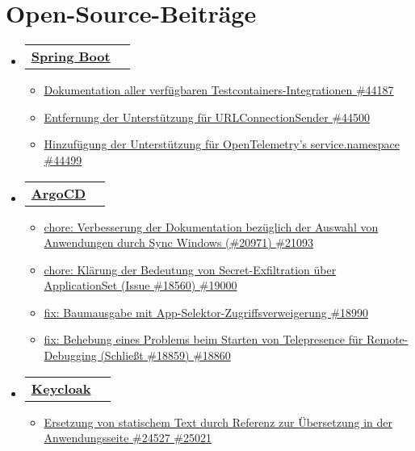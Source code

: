 \documentclass[a4paper,12pt]{article}
\makeatletter
\newcommand{\resumeItem}[1]{
	\item\small{
		{#1 \vspace{-2pt}}
	}
}
\newcommand{\resumeSubheadingSingleLine}[2]{
	\vspace{-2pt}\item
	\begin{tabular*}{0.97\textwidth}[t]{l@{\extracolsep{\fill}}r}
		\textbf{#1} & #2
	\end{tabular*}\vspace{-7pt}
}
\newcommand{\resumeSubHeadingListStart}{\begin{itemize}[leftmargin=0.15in, label={}]}
\newcommand{\resumeSubHeadingListEnd}{\end{itemize}}
\newcommand{\resumeItemListStart}{\begin{itemize}}
\newcommand{\resumeItemListEnd}{\end{itemize}\vspace{-5pt}}
\makeatother
\begin{document}
		\section{Open-Source-Beiträge}
			\resumeSubHeadingListStart
				\resumeSubheadingSingleLine{ \href{https://github.com/spring-projects/spring-boot/pulls/thecooldrop}{Spring Boot}}{}{}{}
					\resumeItemListStart[label=]
						\resumeItem{\href{https://github.com/spring-projects/spring-boot/pull/44187}{Dokumentation aller verfügbaren Testcontainers-Integrationen \#44187}}
						\resumeItem{\href{https://github.com/spring-projects/spring-boot/pull/44500}{Entfernung der Unterstützung für URLConnectionSender \#44500}}
						\resumeItem{\href{https://github.com/spring-projects/spring-boot/pull/44499}{Hinzufügung der Unterstützung für OpenTelemetry's service.namespace \#44499}}
					\resumeItemListEnd
				\resumeSubheadingSingleLine{ \href{https://github.com/argoproj/argo-cd/pulls/thecooldrop}{ArgoCD}}{}{}{}
					\resumeItemListStart[label=]
						\resumeItem{\href{https://github.com/argoproj/argo-cd/pull/21093}{chore: Verbesserung der Dokumentation bezüglich der Auswahl von Anwendungen durch Sync Windows (\#20971) \#21093}}
						\resumeItem{\href{https://github.com/argoproj/argo-cd/pull/19000}{chore: Klärung der Bedeutung von Secret-Exfiltration über ApplicationSet (Issue \#18560) \#19000}}
						\resumeItem{\href{https://github.com/argoproj/argo-cd/pull/18990}{fix: Baumausgabe mit App-Selektor-Zugriffsverweigerung \#18990}}
						\resumeItem{\href{https://github.com/argoproj/argo-cd/pull/18860}{fix: Behebung eines Problems beim Starten von Telepresence für Remote-Debugging (Schließt \#18859) \#18860}}
					\resumeItemListEnd
				\resumeSubheadingSingleLine{ \href{https://github.com/keycloak/keycloak/pulls/thecooldrop}{Keycloak}}{}{}{}
					\resumeItemListStart[label=]
					\resumeItem{\href{https://github.com/keycloak/keycloak/pull/25021}{Ersetzung von statischem Text durch Referenz zur Übersetzung in der Anwendungsseite \#24527 \#25021}}
					\resumeItemListEnd
			\resumeSubHeadingListEnd
		
	
\end{document}
